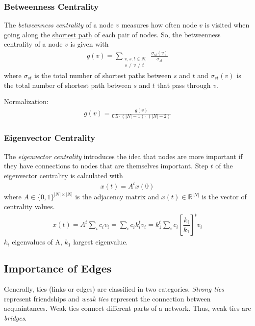 \documentclass[english]{panikzettel}
\begin{document}
\subsubsection{Betweenness Centrality} \label{sec:betweenness_centrality}
The \emph{betweenness centrality} of a node $ v $ measures how often node $ v $ is visited when going along the \hyperref[sec:distance]{shortest path} of each pair of nodes.
So, the betweenness centrality of a node $ v $ is given with
\begin{align*}
	g(v) = \sum\limits_{\substack{v,s,t \in N,\\ s \neq v \neq t}} \frac{\sigma_{st}(v)}{\sigma_{st}}
\end{align*}
where $ \sigma_{st} $ is the total number of shortest paths between $ s $ and $ t $ and $ \sigma_{st}(v) $ is the total number of shortest path between $ s $ and $ t $ that pass through $ v $.

Normalization:
\begin{align*}
	g(v) = \frac{g(v)}{0.5 \cdot (|N| -1) \cdot (|N| - 2)}
\end{align*}

\subsubsection{Eigenvector Centrality}
The \emph{eigenvector centrality} introduces the idea that nodes are more important if they have connections to nodes that are themselves important.
Step $ t $ of the eigenvector centrality is calculated with
\begin{align*}
	x(t) = A^t x(0)
\end{align*}
where $ A \in \{0,1\}^{|N|\times|N|}  $ is the adjacency matrix and $ x(t) \in \mathbb{R}^{|N|} $ is the vector of centrality values.
\begin{align*}
	x(t) = A^t \sum_i c_i v_i = \sum_i c_i k_i^t v_i = k_1^t \sum_i c_i \left[\dfrac{k_i}{k_1}\right]^t v_i
\end{align*}
$ k_i $ eigenvalues of A, $ k_1 $ largest eigenvalue.


\subsection{Importance of Edges}
Generally, ties (links or edges) are classified in two categories.
\emph{Strong ties} represent friendships and \emph{weak ties} represent the connection between acquaintances.
Weak ties connect different parts of a network.
Thus, weak ties are \textit{bridges}.
\end{document}
